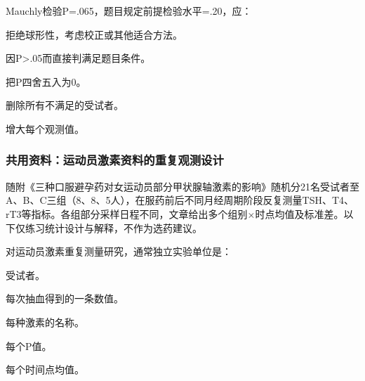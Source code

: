 \par\addvspace{6pt}\noindent\begin{minipage}{\linewidth}


Mauchly检验P=.065，题目规定前提检验水平=.20，应：


\begin{choices}

\item 拒绝球形性，考虑校正或其他适合方法。

\item 因P\textgreater.05而直接判满足题目条件。

\item 把P四舍五入为0。

\item 删除所有不满足的受试者。

\item 增大每个观测值。

\end{choices}

\end{minipage}\par\vspace{4pt}

\subsubsection*{共用资料：运动员激素资料的重复观测设计}

随附《三种口服避孕药对女运动员部分甲状腺轴激素的影响》随机分21名受试者至A、B、C三组（8、8、5人），在服药前后不同月经周期阶段反复测量TSH、T4、rT3等指标。各组部分采样日程不同，文章给出多个组别×时点均值及标准差。以下仅练习统计设计与解释，不作为选药建议。


\par\addvspace{6pt}\noindent\begin{minipage}{\linewidth}


对运动员激素重复测量研究，通常独立实验单位是：


\begin{choices}

\item 受试者。

\item 每次抽血得到的一条数值。

\item 每种激素的名称。

\item 每个P值。

\item 每个时间点均值。

\end{choices}

\end{minipage}\par\vspace{4pt}

